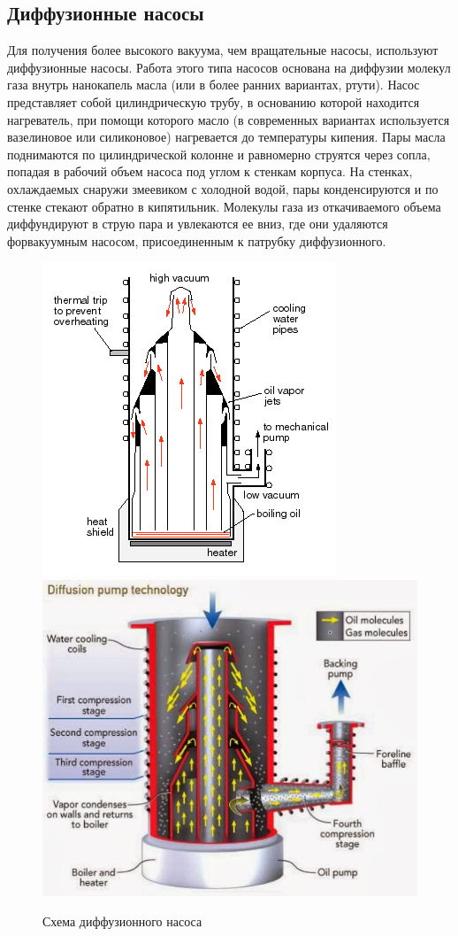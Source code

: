 \documentclass[12pt]{article}
\begin{document}
\subsection*{Диффузионные насосы}

Для получения более высокого вакуума, чем вращательные насосы, используют диффузионные насосы. Работа этого типа насосов основана на диффузии молекул газа внутрь нанокапель масла (или в более ранних вариантах, ртути). Насос представляет собой цилиндрическую трубу, в основанию которой находится нагреватель, при помощи которого масло (в современных вариантах используется вазелиновое или силиконовое) нагревается до температуры кипения. Пары масла поднимаются по цилиндрической колонне и равномерно струятся через сопла, попадая в рабочий объем насоса под углом к стенкам корпуса. На стенках, охлаждаемых снаружи змеевиком с холодной водой, пары конденсируются и по стенке стекают обратно в кипятильник. Молекулы газа из откачиваемого объема диффундируют в струю пара и увлекаются ее вниз, где они удаляются форвакуумным насосом, присоединенным к патрубку диффузионного. 

\begin{figure}
	\centering
	\includegraphics[width=0.45\linewidth]{pictures/diffusion_pump1.jpg}
	\includegraphics[width=0.45\linewidth]{pictures/diffusion_pump2.jpg}
	\caption{Схема диффузионного насоса}
\end{figure}
\end{document}
